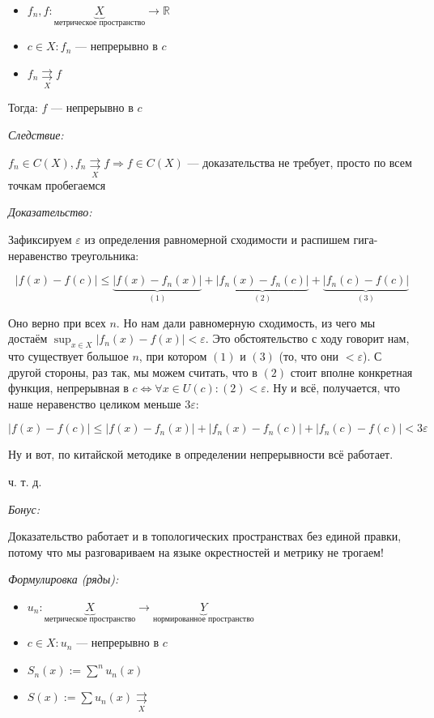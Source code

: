 \documentclass{article}
\def\rsh#1{\underset{#1}{\rightrightarrows}}
\begin{document}
\begin{itemize}
    \item $f_n, f: \underbrace{X}_{\text{метрическое пространство}} \rightarrow \mathbb{R}$
    \item $c \in X: f_n$ --- непрерывно в $c$  
    \item $f_n \rsh{X} f$
\end{itemize}

Тогда: $f$ --- непрерывно в $c$

\textit{Следствие:}

$f_n \in C(X), f_n \rsh{X} f \Rightarrow f \in C(X)$ --- доказательства не требует, просто по всем точкам пробегаемся

\textit{Доказательство:}

Зафиксируем $\varepsilon$ из определения равномерной сходимости и распишем гига-неравенство треугольника:

\[|f(x) - f(c)| \le \underbrace{|f(x) - f_n(x)|}_{(1)} + \underbrace{|f_n(x) - f_n(c)|}_{(2)} + \underbrace{|f_n(c) - f(c)|}_{(3)}\]

Оно верно при всех $n$. Но нам дали равномерную сходимость, из чего мы достаём $\sup_{x \in X} |f_n(x) - f(x)| < \varepsilon$. Это обстоятельство с ходу говорит нам, что существует большое $n$, при котором $(1)$ и $(3)$ (то, что они $< \varepsilon$). С другой стороны, раз так, мы можем считать, что в $(2)$ стоит вполне конкретная функция, непрерывная в $c \Leftrightarrow \forall x \in U(c): (2) < \varepsilon$. Ну и всё, получается, что наше неравенство целиком меньше $3 \varepsilon$:

\[|f(x) - f(c)| \le |f(x) - f_n(x)| + |f_n(x) - f_n(c)| + |f_n(c) - f(c)| < 3\varepsilon\]

Ну и вот, по китайской методике в определении непрерывности всё работает.

ч. т. д.

\textit{Бонус:}

\Smiley 

Доказательство работает и в топологических пространствах без единой правки, потому что мы разговариваем на языке окрестностей и метрику не трогаем!

\textit{Формулировка (ряды):}

\begin{itemize}
    \item $u_n: \underbrace{X}_{\text{метрическое пространство}} \rightarrow \underbrace{Y}_{\text{нормированное пространство}}$
    \item $c \in X: u_n$ --- непрерывно в $c$ 
    \item $S_n(x) := \sum^n u_n(x)$
    \item $S(x) := \sum u_n(x) \rsh{X}$
\end{itemize}
\end{document}
